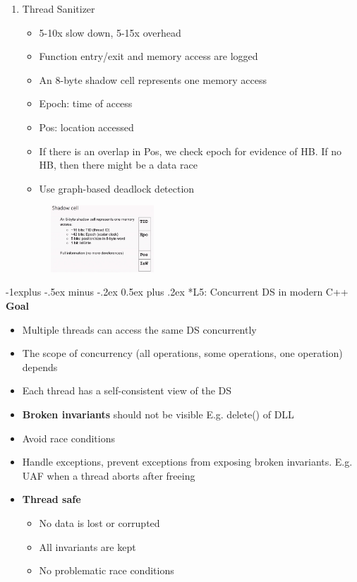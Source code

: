 \documentclass[10pt, landscape]{article}
\makeatletter
\renewcommand{\subsection}{\@startsection{subsection}{2}{0mm}%
                                {-1explus -.5ex minus -.2ex}%
                                {0.5ex plus .2ex}%
                                {\normalfont\normalsize\bfseries}}
\makeatother
\begin{document}
\begin{multicols}{4}
\begin{itemize}
\begin{enumerate}
        \item Thread Sanitizer 
        \begin{itemize}
            \item 5-10x slow down, 5-15x overhead
            \item Function entry/exit and memory access are logged
            \item An 8-byte shadow cell represents one memory access
            \item Epoch: time of access
            \item Pos: location accessed
            \item If there is an overlap in Pos, we check epoch for evidence of HB. If no HB, then there might be a data race
            \item Use graph-based deadlock detection
        \end{itemize}
        \includegraphics*[width=6cm,height=2.5cm]{tsan_1.png}

    \end{enumerate}

\end{itemize}


\subsection*{L5: Concurrent DS in modern C++}
\textbf{Goal} \\
\begin{itemize}
    \item Multiple threads can access the same DS concurrently
    \item The scope of concurrency (all operations, some operations, one operation) depends
    \item Each thread has a self-consistent view of the DS 
    \item \textbf{Broken invariants} should not be visible E.g. delete() of DLL
    \item Avoid race conditions
    \item Handle exceptions, prevent exceptions from exposing broken invariants. E.g. UAF when a thread aborts after freeing
    \item \textbf{Thread safe}
    \begin{itemize}
        \item No data is lost or corrupted
        \item All invariants are kept 
        \item No problematic race conditions
    \end{itemize}
\end{itemize}


\end{multicols}
\end{document}
